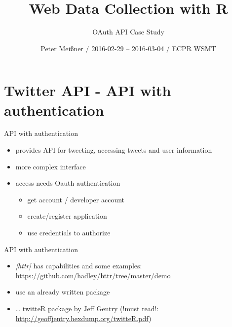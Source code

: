 \documentclass[ignorenonframetext,]{beamer}
\title{Web Data Collection with R}
\subtitle{OAuth API Case Study}
\author{Peter Meißner / 2016-02-29 -- 2016-03-04 / ECPR WSMT}
\date{}
\providecommand{\tightlist}{%
  \setlength{\itemsep}{0pt}\setlength{\parskip}{0pt}}
\begin{document}
\frame{\titlepage}

\begin{frame}
\tableofcontents[hideallsubsections]
\end{frame}

\section{Twitter API - API with
authentication}\label{twitter-api---api-with-authentication}

\begin{frame}{API with authentication}

\begin{itemize}
\tightlist
\item
  provides API for tweeting, accessing tweets and user information
\item
  more complex interface
\item
  access needs Oauth authentication

  \begin{itemize}
  \tightlist
  \item
    get account / developer account
  \item
    create/register application
  \item
    use credentials to authorize
  \end{itemize}
\end{itemize}

\end{frame}

\begin{frame}{API with authentication}

\begin{itemize}
\tightlist
\item
  \emph{{[}httr{]}} has capabilities and some examples:
  \url{https://github.com/hadley/httr/tree/master/demo}
\item
  use an already written package
\item
  \ldots{} twitteR package by Jeff Gentry (!must read!:
  \url{http://geoffjentry.hexdump.org/twitteR.pdf})
\end{itemize}

\end{frame}
\end{document}
